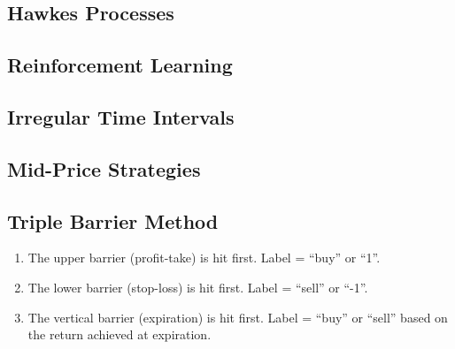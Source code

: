 \documentclass{article}
\begin{document}
\subsection{Hawkes Processes \cite{hawkes}}

\subsection{Reinforcement Learning \cite{reinforcement}}

\subsection{Irregular Time Intervals \cite{garch}}

\subsection{Mid-Price Strategies \cite{midprice}}

\subsection{Triple Barrier Method}
\begin{enumerate}
    \item The upper barrier (profit-take) is hit first. Label = “buy” or “1”.
    
    \item The lower barrier (stop-loss) is hit first. Label = “sell” or “-1”.
    
    \item The vertical barrier (expiration) is hit first. Label = “buy” or “sell” based on the return achieved at expiration.
    
\end{enumerate}



\printbibliography
\end{document}
